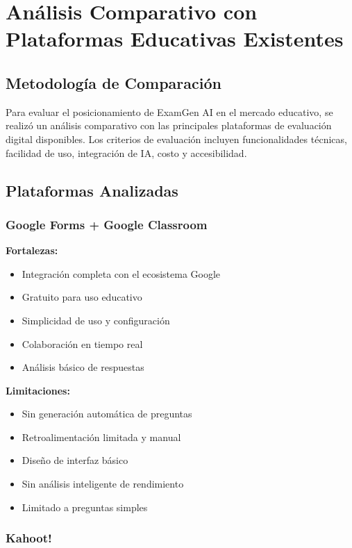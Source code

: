 \documentclass[12pt,a4paper]{report}
\begin{document}
\section{Análisis Comparativo con Plataformas Educativas Existentes}

\subsection{Metodología de Comparación}

Para evaluar el posicionamiento de ExamGen AI en el mercado educativo, se realizó un análisis comparativo con las principales plataformas de evaluación digital disponibles. Los criterios de evaluación incluyen funcionalidades técnicas, facilidad de uso, integración de IA, costo y accesibilidad.

\subsection{Plataformas Analizadas}

\subsubsection{Google Forms + Google Classroom}

\textbf{Fortalezas:}
\begin{itemize}
\item Integración completa con el ecosistema Google
\item Gratuito para uso educativo
\item Simplicidad de uso y configuración
\item Colaboración en tiempo real
\item Análisis básico de respuestas
\end{itemize}

\textbf{Limitaciones:}
\begin{itemize}
\item Sin generación automática de preguntas
\item Retroalimentación limitada y manual
\item Diseño de interfaz básico
\item Sin análisis inteligente de rendimiento
\item Limitado a preguntas simples
\end{itemize}

\subsubsection{Kahoot!}
\end{document}
